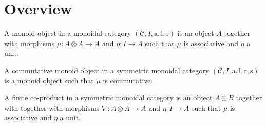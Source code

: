 \documentclass{llncs}
\begin{document}
% 

\section{Overview}

\begin{definition}
   A monoid object in a monoidal category $(\mathcal{C}, I, \mathrm{a}, \mathrm{l}, \mathrm{r})$ is an object $A$ together with morphisms $\mu: A \otimes A \to A$ and $\eta: I \to A$ such that $\mu$ is associative and $\eta$ a unit.
   
   A commutative monoid object in a symmetric monoidal category $(\mathcal{C}, I, \mathrm{a}, \mathrm{l}, \mathrm{r}, \mathrm{s})$ is a monoid object such that $\mu$ is commutative.
   
   A finite co-product in a symmetric monoidal category is an object $A \otimes B$ together with together with morphisms $\nabla: A \otimes A \to A$ and $\eta: I \to A$ such that $\mu$ is associative and $\eta$ a unit.
\end{definition}
   
\end{document}
